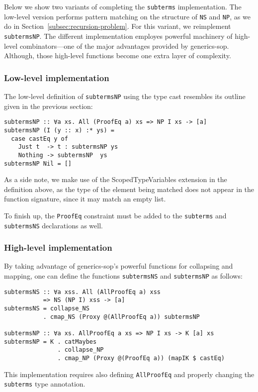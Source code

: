 \documentclass[runningheads]{llncs}
\newcommand{\K}[1]{\lstinline[style=fancy]{#1}}
\begin{document}
Below we show two variants of completing the \K{subterms} implementation. The low-level version performs pattern matching on the structure of \K{NS} and \K{NP}, as we do in Section~\ref{subsec:recursion-problem}. For this variant, we reimplement \K{subtermsNP}. The different implementation employes powerful machinery of high-level combinators---one of the major advantages provided by \textsf{generics-sop}. Although, those high-level functions become one extra layer of complexity.

\subsubsection{Low-level implementation}

The low-level definition of \K{subtermsNP} using the type cast resembles its outline given in the previous section:
\begin{lstlisting}[style=fancy]
subtermsNP :: ∀a xs. All (ProofEq a) xs => NP I xs -> [a]
subtermsNP (I (y :: x) :* ys) =
  case castEq y of
    Just t  -> t : subtermsNP ys
    Nothing -> subtermsNP  ys
subtermsNP Nil = []
\end{lstlisting}

As a side note, we make use of the \textsf{ScopedTypeVariables} extension in the definition above, as the type of the element being matched does not appear in the function signature, since it may match an empty list. 

To finish up, the \K{ProofEq} constraint must be added to the \K{subterms} and \K{subtermsNS} declarations as well.

\subsubsection{High-level implementation}

By taking advantage of \textsf{generics-sop}'s powerful functions for collapsing and mapping, one can define the functions \K{subtermsNS} and \K{subtermsNP} as follows:
\begin{lstlisting}[style=fancy]
subtermsNS :: ∀a xss. All (AllProofEq a) xss
           => NS (NP I) xss -> [a]
subtermsNS = collapse_NS
           . cmap_NS (Proxy @(AllProofEq a)) subtermsNP

subtermsNP :: ∀a xs. AllProofEq a xs => NP I xs -> K [a] xs
subtermsNP = K . catMaybes
               . collapse_NP
               . cmap_NP (Proxy @(ProofEq a)) (mapIK $ castEq)
\end{lstlisting}
This implementation requires also defining \K{AllProofEq} and properly changing the \K{subterms} type annotation.
\end{document}
